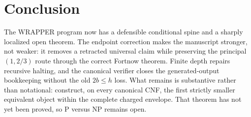 \documentclass[11pt]{article}
\begin{document}
\section{Conclusion}

The WRAPPER program now has a defensible conditional spine and a sharply
localized open theorem.  The endpoint correction makes the manuscript
stronger, not weaker: it removes a retracted universal claim while preserving
the principal $(1,2/3)$ route through the correct Fortnow theorem.  Finite
depth repairs recursive halting, and the canonical verifier closes the
generated-output bookkeeping without the old $2b\le h$ loss.  What remains
is substantive rather than notational: construct, on every canonical CNF,
the first strictly smaller equivalent object within the complete charged
envelope.  That theorem has not yet been proved, so P versus NP remains open.



\end{document}
